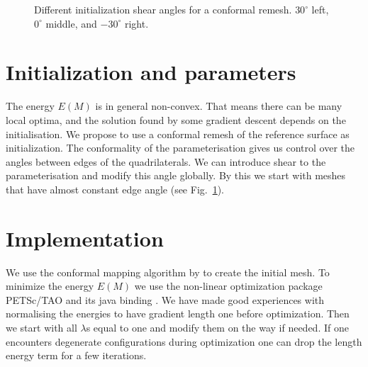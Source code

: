 \begin{figure}[ht]
\centering
{}
\caption{Different initialization shear angles for a conformal remesh. $30^\circ$ left, $0^\circ$ middle, and $-30^\circ$ right.}
\label{fig:initial_grids}
\end{figure}
\section{Initialization and parameters}
The energy $E(M)$ is in general non-convex. That means there can be many local optima, and the solution found by some gradient descent depends on the initialisation. We propose to use a conformal remesh of the reference surface as initialization. The conformality of the parameterisation gives us control over the angles between edges of the quadrilaterals. We can introduce shear to the parameterisation and modify this angle globally. By this we start with meshes that have almost constant edge angle (see Fig.~\ref{fig:initial_grids}).

\section{Implementation}
We use the conformal mapping algorithm by \cite{Springborn2008} to create the
initial mesh. To minimize the energy $E(M)$ we use the non-linear optimization package
PETSc/TAO \cite{petsc-web-page,tao-user-ref} and its java binding 
\cite{jpetsctao-web-page}. We have made good experiences with normalising the
 energies to have gradient length one before optimization. Then we start with all
$\lambda$s equal to one and modify them on the way if needed. If one encounters
degenerate configurations during optimization one can drop the length energy term for 
a few iterations.

